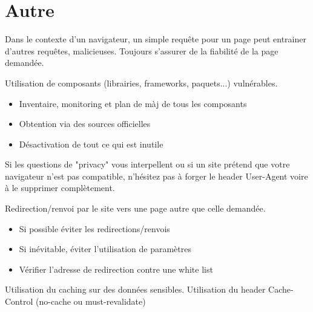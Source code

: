 \documentclass[a4paper]{article}
\begin{document}
\section{Autre}





\begin{attaque}
    Dans le contexte d’un navigateur, un simple requête pour un page peut entrainer d’autres requêtes, malicieuses. Toujours s’assurer de la fiabilité de la page demandée.
\end{attaque}

\begin{attaque}
    Utilisation de composants (librairies, frameworks, paquets...) vulnérables.
    \begin{itemize}
        \item Inventaire, monitoring et plan de màj de tous les composants
        \item Obtention via des sources officielles
        \item Désactivation de tout ce qui est inutile
    \end{itemize}
\end{attaque}

\begin{bonnepratique}
    Si les questions de "privacy" vous interpellent ou si un site prétend que votre navigateur n’est pas compatible, n’hésitez pas à forger le header User-Agent voire à le supprimer complètement.
\end{bonnepratique}

\begin{attaque}
    Redirection/renvoi par le site vers une page autre que celle demandée.
    \begin{itemize}
        \item Si possible éviter les redirections/renvois
        \item Si inévitable, éviter l’utilisation de paramètres
        \item Vérifier l’adresse de redirection contre une white list
    \end{itemize}
\end{attaque}

\begin{mauvaisepratique}
    Utilisation du caching sur des données sensibles.
    Utilisation du header Cache-Control (no-cache ou must-revalidate)
\end{mauvaisepratique}
\end{document}
